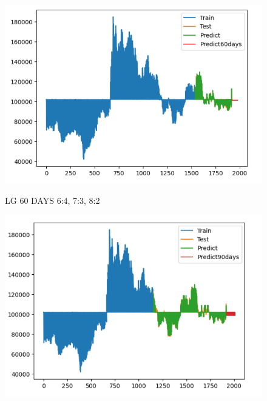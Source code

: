 \documentclass{article}
\begin{document}
\begin{multicols}{2}
\begin{figure}[H]
\begin{minipage}{0.15\textwidth}
    \label{fig:2}
    \end{minipage}%
    \begin{minipage}{0.15\textwidth}
    \centering
    \includegraphics[width=1\textwidth]{Image/GradientBoosting/LG_60_8_2_GradientBoostingRegressor.png}

    \label{fig:3}
    \end{minipage}
    \caption{LG 60 DAYS  6:4, 7:3, 8:2 }
\end{figure}

\begin{figure}[H]
    \centering
    \begin{minipage}{0.15\textwidth}
    \centering
    \includegraphics[width=1\textwidth]{Image/GradientBoosting/LG_90_6_4_GradientBoostingRegressor.png}
   

\end{minipage}
\end{figure}
\end{multicols}
\end{document}

